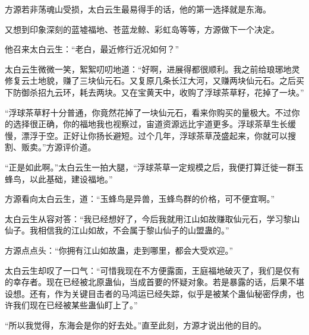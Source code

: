 \begin{this_body}
方源若非荡魂山受损，太白云生最易得手的话，他的第一选择就是东海。

又想到印象深刻的蓝墟福地、苍蓝龙鲸、彩虹岛等等，方源做下一个决定。

他召来太白云生：“老白，最近修行近况如何？”

太白云生微微一笑，絮絮叨叨地道：“好啊，进展得都很顺利。我之前给琅琊地灵修复云土地貌，赚了三块仙元石。又复原几条长江大河，又赚两块仙元石。之后买下防御杀招九云环，耗去两块。又在宝黄天中，收购了浮球茶草籽，花掉了一块。”

“浮球茶草籽十分普通，你竟然花掉了一块仙元石，看来你购买的量极大。不过你的选择很正确，你的福地我也视察过，宙道资源远比宇道更多。浮球茶草生长缓慢，漂浮于空。正好让你扬长避短。过个几年，浮球茶草茂盛起来，你就可以搜割、贩卖。”方源评价道。

“正是如此啊。”太白云生一拍大腿，“浮球茶草一定规模之后，我便打算迁徙一群玉蜂鸟，以此基础，建设福地。”

方源看向太白云生，道：“玉蜂鸟是异兽，玉蜂鸟群的价格，可不便宜啊。”

太白云生从容对答：“我已经想好了，今后我就用江山如故赚取仙元石，学习黎山仙子。我相信我的江山如故，不会属于黎山仙子的山盟蛊的。”

方源点点头：“你拥有江山如故蛊，走到哪里，都会大受欢迎。”

太白云生却叹了一口气：“可惜我现在不方便露面，王庭福地破灭了，我们是仅有的幸存者。现在已经被北原蛊仙，当成首要的怀疑对象。若是暴露的话，后果不堪设想。还有，作为关键目击者的马鸿运已经失踪，似乎是被某个蛊仙秘密俘虏，也许我们现在已经被某些蛊仙盯上了。”

“所以我觉得，东海会是你的好去处。”直至此刻，方源才说出他的目的。

\end{this_body}

